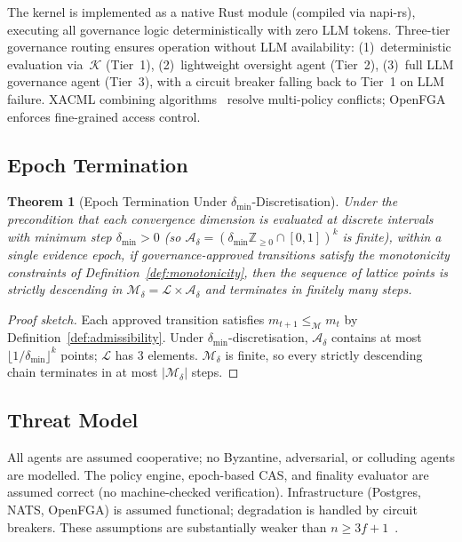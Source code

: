 \documentclass[11pt]{article}
\newtheorem{theorem}{Theorem}
\begin{document}
The kernel is implemented as a native Rust module (compiled via napi-rs), executing all governance logic deterministically with zero LLM tokens.
Three-tier governance routing ensures operation without LLM availability: (1)~deterministic evaluation via~$\mathcal{K}$ (Tier~1), (2)~lightweight oversight agent (Tier~2), (3)~full LLM governance agent (Tier~3), with a circuit breaker falling back to Tier~1 on LLM failure.
XACML combining algorithms~\cite{xacml2013} resolve multi-policy conflicts; OpenFGA~\cite{pang2019} enforces fine-grained access control.

\subsection{Epoch Termination}

\begin{theorem}[Epoch Termination Under $\delta_{\min}$-Discretisation]
\label{thm:termination}
Under the precondition that each convergence dimension is evaluated at discrete intervals with minimum step $\delta_{\min} > 0$ (so $\mathcal{A}_\delta = (\delta_{\min}\mathbb{Z}_{\geq 0} \cap [0,1])^k$ is finite), within a single evidence epoch, if governance-approved transitions satisfy the monotonicity constraints of Definition~\ref{def:monotonicity}, then the sequence of lattice points is strictly descending in $\mathcal{M}_\delta = \mathcal{L} \times \mathcal{A}_\delta$ and terminates in finitely many steps.
\end{theorem}

\begin{proof}[Proof sketch]
Each approved transition satisfies $m_{t+1} \leq_{\mathcal{M}} m_t$ by Definition~\ref{def:admissibility}.
Under $\delta_{\min}$-discretisation, $\mathcal{A}_\delta$ contains at most $\lfloor 1/\delta_{\min} \rfloor^k$ points; $\mathcal{L}$ has 3 elements.
$\mathcal{M}_\delta$ is finite, so every strictly descending chain terminates in at most $|\mathcal{M}_\delta|$ steps.
\end{proof}

\subsection{Threat Model}

All agents are assumed cooperative; no Byzantine, adversarial, or colluding agents are modelled.
The policy engine, epoch-based CAS, and finality evaluator are assumed correct (no machine-checked verification).
Infrastructure (Postgres, NATS, OpenFGA) is assumed functional; degradation is handled by circuit breakers.
These assumptions are substantially weaker than $n \geq 3f+1$~\cite{lamport1982}.
\end{document}
